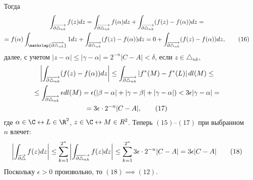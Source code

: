 \documentclass[main]{subfiles}
\begin{document}
\begin{longProof}
    Тогда
    \begin{multline*}
        \AnClOrInt[\AnClOrCurve[\partial \triangle_{nk}]] f(z) dz = \AnClOrInt[\AnClOrCurve[\partial \triangle_{nk}]] f(\alpha) dz + \AnClOrInt[\AnClOrCurve[\partial \triangle_{nk}]] (f(z) - f(\alpha)) dz =\\
        = f(\alpha) \AnClOrInt[\mathrlap{\AnClOrCurve[\partial \triangle_{nk}]}] 1 dz + \AnClOrInt[\AnClOrCurve[\partial \triangle_{nk}]] (f(z) - f(\alpha)) dz = 0 + \AnClOrInt[\AnClOrCurve[\partial \triangle_{nk}]] (f(z) - f(\alpha)) dz, \tag{16}
    \end{multline*}
    далее, с учетом $|z - \alpha| \le |\gamma - \alpha| = 2^{-n} |C - A| < \delta$, если $z \in \triangle_{nk}$,
    \begin{multline*}
        \left| \AnClOrInt[\AnClOrCurve[\partial \triangle_{nk}]] (f(z) - f(\alpha)) dz \right| \le \AnClOrInt[\AnClOrCurve[\partial \triangle_{nk}]] \left| f^*(M) - f^*(L) \right| dl(M) \le \\
        \le \AnClOrInt[\AnClOrCurve[\partial \triangle_{nk}]] \epsilon dl(M) = \epsilon (|\beta - \alpha| + |\gamma - \beta| + |\gamma - \alpha|) < 3 \epsilon |\gamma - \alpha| = \\
        = 3 \epsilon \cdot 2^{-n}|C - A|, \tag{17}
    \end{multline*}
    где $\alpha \in \C \leftrightarrow L \in \R^2$, $z \in \C \leftrightarrow M \in R^2$.
    Теперь $(15)$--$(17)$ при выбранном $n$ влечет:
    \[\left| \AnClOrInt[\AnClOrCurve[\partial \triangle]] f(z) dz \right| \le \sum_{k=1}^{2^n} \left| \AnClOrInt[\AnClOrCurve[\partial \triangle_{nk}]] f(z) dz \right| \le \sum_{k=1}^{2^n} 3 \epsilon \cdot 2^{-n}|C - A| = 3 \epsilon |C - A| \tag{18}\]
    Поскольку $\epsilon > 0$ произвольно, то $(18) \implies (12)$.
\end{longProof}
\end{document}
